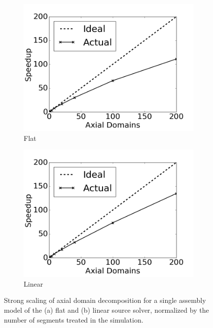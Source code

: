 \begin{figure}[h!]
	\centering
	\begin{subfigure}{0.45\textwidth}
		\centering
		\includegraphics[width=\linewidth]{figures/DD/sa-scaling-fs-ts-norm.png}
		\caption{Flat}
		\label{fig:dd-sa-fs-norm}
	\end{subfigure}
	\begin{subfigure}{0.45\textwidth}
		\centering
		\includegraphics[width=\linewidth]{figures/DD/sa-scaling-ls-ts-norm.png}
		\caption{Linear}
		\label{fig:dd-sa-ls-norm}
	\end{subfigure}
	\caption[]{Strong scaling of axial domain decomposition for a single assembly model of the (a) flat and (b) linear source solver, normalized by the number of segments treated in the simulation.}
	\label{fig:strong-scaling-single-assembly-normalized}
\end{figure}

